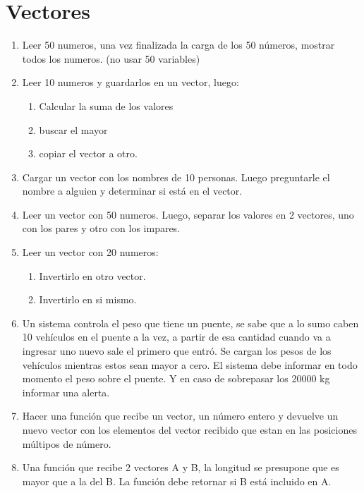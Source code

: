 \chapter{Vectores}

 \begin{enumerate}[resume]

\item Leer 50 numeros, una vez finalizada la carga de los 50 números, mostrar todos los numeros. (no usar 50 variables)


\item Leer 10 numeros y guardarlos en un vector, luego:
	\begin{enumerate}
	\item Calcular la suma de los valores
	\item buscar el mayor
	\item copiar el vector a otro.
	\end{enumerate}

\item Cargar un vector con los nombres de 10 personas. Luego preguntarle el nombre a alguien y determinar si está en el vector.

\item Leer un vector con 50 numeros. Luego, separar los valores en 2 vectores, uno con los pares y otro con los impares.

\item Leer un vector con 20 numeros:
	\begin{enumerate}
	\item Invertirlo en otro vector.
	\item Invertirlo en si mismo.
	\end{enumerate}

\item  Un sistema controla el peso que tiene un puente, se sabe que a lo sumo caben 10 vehículos en el puente a la vez, a partir de esa cantidad cuando va a ingresar uno nuevo sale el primero que entró. Se cargan los pesos de los vehículos mientras estos sean mayor a cero. El sistema debe informar en todo momento el peso sobre el puente. Y en caso de sobrepasar los 20000 kg informar una alerta.

\item Hacer una función que recibe un vector, un número entero y devuelve un nuevo vector con los elementos del vector recibido que estan en las posiciones múltipos de número.
  
\item Una función que recibe 2 vectores A y B, la longitud se presupone que es mayor que a la del B. La función debe retornar si B está incluido en A.
  

\end{enumerate}
